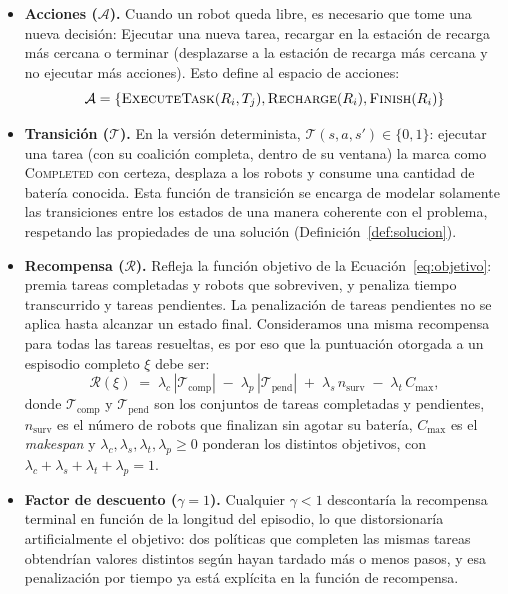 \begin{itemize}
\begin{itemize}
    \end{itemize}

    \item \textbf{Acciones ($\mathcal{A}$).} Cuando un robot queda libre, es necesario que tome una nueva decisión: Ejecutar una nueva tarea, recargar en la estación de recarga más cercana o terminar (desplazarse a la estación de recarga más cercana y no ejecutar más acciones). Esto define al espacio de acciones:
    \begin{equation}
        \mathcal{A} = \{\textsc{ExecuteTask}(R_i,T_j), \textsc{Recharge}(R_i), \textsc{Finish}(R_i)\}
    \end{equation} 
    
    \item \textbf{Transición ($\mathcal{T}$).} En la versión determinista, $\mathcal{T}(s,a,s')\in\{0,1\}$: ejecutar una tarea (con su coalición completa, dentro de su ventana) la marca como \textsc{Completed} con certeza, desplaza a los robots y consume una cantidad de batería conocida. Esta función de transición se encarga de modelar solamente las transiciones entre los estados de una manera coherente con el problema, respetando las propiedades de una solución (Definición~\ref{def:solucion}).
    
    \item \textbf{Recompensa ($\mathcal{R}$).} Refleja la función objetivo de la Ecuación~\eqref{eq:objetivo}: premia tareas completadas y robots que sobreviven, y penaliza tiempo transcurrido y tareas pendientes. La penalización de tareas pendientes no se aplica hasta alcanzar un estado final. Consideramos una misma recompensa para todas las tareas resueltas, es por eso que la puntuación otorgada a un espisodio completo $\xi$ debe ser:
    \begin{equation}
    \mathcal{R}(\xi) \;=\; \lambda_c\, |\mathcal{T}_{\mathrm{comp}}| \;-\; \lambda_p\, |\mathcal{T}_{\mathrm{pend}}|   \;+\; \lambda_s\, n_{\mathrm{surv}}     \;-\; \lambda_t\, C_{\max}, 
    \end{equation} 
    donde $\mathcal{T}_{\mathrm{comp}}$ y $\mathcal{T}_{\mathrm{pend}}$ son los conjuntos de tareas completadas y pendientes, $n_{\mathrm{surv}}$ es el número de robots que finalizan sin agotar su batería, $C_{\max}$ es el \textit{makespan} y $\lambda_c,\lambda_s,\lambda_t,\lambda_p\ge 0$ ponderan los distintos objetivos, con $\lambda_c+\lambda_s+\lambda_t+\lambda_p = 1$.

    \item \textbf{Factor de descuento ($\gamma = 1$).} Cualquier $\gamma < 1$ descontaría la recompensa terminal en función de la longitud del episodio, lo que distorsionaría artificialmente el objetivo: dos políticas que completen las mismas tareas obtendrían valores distintos según hayan tardado más o menos pasos, y esa penalización por tiempo ya está explícita en la función de recompensa.
\end{itemize}

